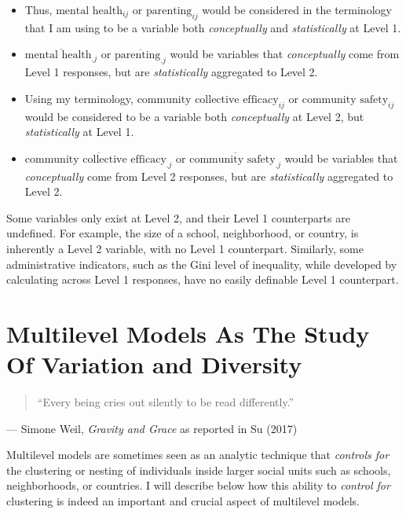 \documentclass[
  letterpaper,
  DIV=11,
  numbers=noendperiod]{scrreprt}
\begin{document}
\begin{itemize}
\item
  Thus, \(\text{mental health}_{ij}\) or \(\text{parenting}_{ij}\) would
  be considered in the terminology that I am using to be a variable both
  \emph{conceptually} and \emph{statistically} at Level 1.
\item
  \(\overline{\text{mental health}_{.j}}\) or
  \(\overline{\text{parenting}_{.j}}\) would be variables that
  \emph{conceptually} come from Level 1 responses, but are
  \emph{statistically} aggregated to Level 2.
\item
  Using my terminology, \(\text{community collective efficacy}_{ij}\) or
  \(\text{community safety}_{ij}\) would be considered to be a variable
  both \emph{conceptually} at Level 2, but \emph{statistically} at Level
  1.
\item
  \(\overline{\text{community collective efficacy}_{.j}}\) or
  \(\overline{\text{community safety}_{.j}}\) would be variables that
  \emph{conceptually} come from Level 2 responses, but are
  \emph{statistically} aggregated to Level 2.
\end{itemize}

Some variables only exist at Level 2, and their Level 1 counterparts are
undefined. For example, the size of a school, neighborhood, or country,
is inherently a Level 2 variable, with no Level 1 counterpart.
Similarly, some administrative indicators, such as the Gini level of
inequality, while developed by calculating across Level 1 responses,
have no easily definable Level 1 counterpart.

\hypertarget{sec-studyvariation}{%
\section{Multilevel Models As The Study Of Variation and
Diversity}\label{sec-studyvariation}}

\begin{quote}
``Every being cries out silently to be read differently.''
\end{quote}

--- Simone Weil, \emph{Gravity and Grace} as reported in Su (2017)

Multilevel models are sometimes seen as an analytic technique that
\emph{controls for} the clustering or nesting of individuals inside
larger social units such as schools, neighborhoods, or countries. I will
describe below how this ability to \emph{control for} clustering is
indeed an important and crucial aspect of multilevel models.
\end{document}
